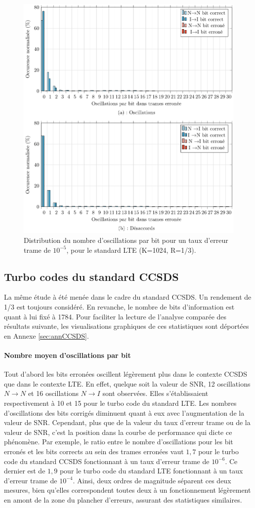 \begin{figure}[!t]
	\centering
	\includegraphics[width=.8\textwidth]{main/ch2_fig/tikz/d_lte_10-5.pdf}
	\caption{Distribution du nombre d'oscillations par bit pour un taux d'erreur trame de $10^{-5}$, pour le standard LTE (K=1024, R=1/3). \label{fig:d_lte_10-5}}
\end{figure}

\subsection{Turbo codes du standard CCSDS}
La même étude à été menée dans le cadre du standard CCSDS. Un rendement de 1/3 est toujours considéré. En revanche, le nombre 
de bits d'information est quant à lui fixé à 1784. Pour faciliter la lecture de l'analyse comparée des résultats suivante, 
les visualisations graphiques de ces statistiques sont déportées en Annexe \ref{sec:annCCSDS}.
\paragraph*{Nombre moyen d'oscillations par bit} 
Tout d'abord les bits erronées oscillent légèrement plus dans le contexte CCSDS que dans le contexte LTE. En effet, 
quelque soit la valeur de SNR, 12 oscillations $N\rightarrow N$ et 16 oscillations $N\rightarrow I$ sont observées. Elles 
s'établissaient respectivement à 10 et 15 pour le turbo code du standard LTE. Les nombres d'oscillations des bits corrigés diminuent quant à eux
avec l’augmentation de la valeur de SNR. Cependant, plus que de la valeur du taux d'erreur trame ou de la valeur de SNR,
c'est la position dans la courbe de performance qui dicte ce phénomène. Par exemple, le ratio entre le nombre 
d'oscillations pour les bit erronés et les bits corrects au sein des trames erronées vaut $1,7$ pour le turbo code du 
standard CCSDS fonctionnant à un taux d'erreur trame de $10^{-6}$. Ce dernier est de $1,9$ pour le turbo code du 
standard LTE fonctionnant à un taux d'erreur trame de $10^{-4}$. Ainsi, deux ordres de magnitude séparent ces deux mesures,
bien qu'elles correspondent toutes deux à un fonctionnement légèrement en amont de la zone du plancher d'erreurs, assurant des statistiques similaires.

